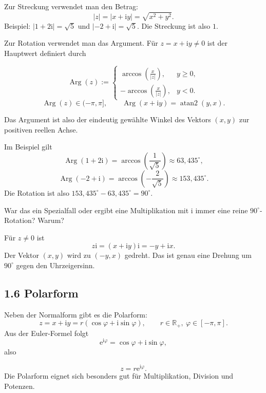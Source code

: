 \documentclass[11pt,a4paper]{article}
\newcommand{\R}{\mathbb R}
\newcommand{\ii}{\mathrm i}
\newcommand{\ee}{\mathrm e}
\newcommand{\Arg}{\operatorname{Arg}}
\begin{document}
Zur Streckung verwendet man den Betrag:
\[
 |z|=|x+\ii y|=\sqrt{x^2+y^2}.
\]
Beispiel: $|1+2\ii|=\sqrt{5}$ und $|-2+\ii|=\sqrt{5}$. Die Streckung ist also $1$.

Zur Rotation verwendet man das Argument. Für $z=x+\ii y\neq 0$ ist der Hauptwert definiert durch
\begin{importantbox}[title=Definition des Arguments]
\begin{minipage}[c]{0.68\linewidth}
\[
\Arg(z):=
\begin{cases}
\displaystyle \arccos\left(\frac{x}{|z|}\right), & y\geq 0,\\[1.2ex]
\displaystyle -\arccos\left(\frac{x}{|z|}\right), & y<0.
\end{cases}
\]
\[
\Arg(z)\in(-\pi,\pi],
\qquad
\Arg(x+\ii y)=\operatorname{atan2}(y,x).
\]
\end{minipage}\hfill
\begin{minipage}[c]{0.27\linewidth}
\centering
{}
\end{minipage}
\end{importantbox}
Das Argument ist also der eindeutig gewählte Winkel des Vektors $(x,y)$ zur positiven reellen Achse.

Im Beispiel gilt
\[
\Arg(1+2\ii)=\arccos\left(\frac1{\sqrt5}\right)\approx 63{,}435^\circ,
\]
\[
\Arg(-2+\ii)=\arccos\left(-\frac2{\sqrt5}\right)\approx 153{,}435^\circ.
\]
Die Rotation ist also $153{,}435^\circ-63{,}435^\circ=90^\circ$.

\begin{fragebox}
War das ein Spezialfall oder ergibt eine Multiplikation mit $\ii$ immer eine reine $90^\circ$-Rotation? Warum?
\end{fragebox}
\begin{antwortbox}
Für $z\neq0$ ist
\[
 z\ii = (x+\ii y)\ii=-y+\ii x.
\]
Der Vektor $(x,y)$ wird zu $(-y,x)$ gedreht. Das ist genau eine Drehung um $90^\circ$ gegen den Uhrzeigersinn.
\end{antwortbox}

\subsection{1.6 Polarform}
Neben der Normalform gibt es die Polarform:
\[
z=x+\ii y=r(\cos\varphi+\ii\sin\varphi),\qquad r\in\R_+,\ \varphi\in[-\pi,\pi].
\]
Aus der Euler-Formel folgt
\[
\ee^{\ii\varphi}=\cos\varphi+\ii\sin\varphi,
\]
also
\begin{importantbox}
\[
 z=r\ee^{\ii\varphi}.
\]
Die Polarform eignet sich besonders gut für Multiplikation, Division und Potenzen.
\end{importantbox}
\end{document}
